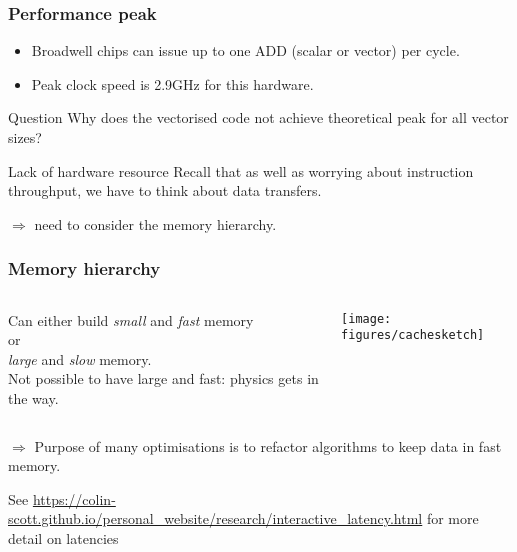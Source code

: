 \documentclass[presentation,aspectratio=43,10pt]{beamer}
\begin{document}
\begin{frame}
  \frametitle{Performance peak}
  \begin{itemize}
  \item Broadwell chips can issue up to one ADD (scalar or vector) per
    cycle.
  \item Peak clock speed is 2.9GHz for this hardware.
  \end{itemize}
  \begin{challenge}{Question}
    Why does the vectorised code not achieve theoretical peak for all
    vector sizes?
  \end{challenge}
  \pause
  \begin{answer}{Lack of hardware resource}
    Recall that as well as worrying about instruction throughput, we
    have to think about data transfers.

    $\Rightarrow$ need to consider the memory hierarchy.
  \end{answer}
\end{frame}

\begin{frame}
  \frametitle{Memory hierarchy}
  \begin{columns}
    \begin{column}{0.45\textwidth}
      Can either build \emph{small} and \emph{fast} memory\\
      or\\[\baselineskip]
      \emph{large} and \emph{slow} memory.\\[\baselineskip]

      Not possible to have large and fast: physics gets in the way.
    \end{column}
    \begin{column}{0.4\textwidth}
      \begin{center}
        \texttt{[image: figures/cachesketch]}
      \end{center}
    \end{column}
  \end{columns}
  \vspace{\baselineskip}
  $\Rightarrow$ Purpose of many optimisations is to refactor
  algorithms to keep data in fast memory.

  
  {\footnotesize See
    \url{https://colin-scott.github.io/personal_website/research/interactive_latency.html}
    for more detail on latencies}
\end{frame}
\end{document}
